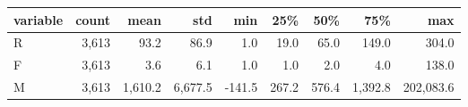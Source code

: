 \begin{tabular}{lrrrrrrrr}
\toprule
variable & count & mean & std & min & 25\% & 50\% & 75\% & max \\
\midrule
R & 3,613 & 93.2 & 86.9 & 1.0 & 19.0 & 65.0 & 149.0 & 304.0 \\
F & 3,613 & 3.6 & 6.1 & 1.0 & 1.0 & 2.0 & 4.0 & 138.0 \\
M & 3,613 & 1,610.2 & 6,677.5 & -141.5 & 267.2 & 576.4 & 1,392.8 & 202,083.6 \\
\bottomrule
\end{tabular}
